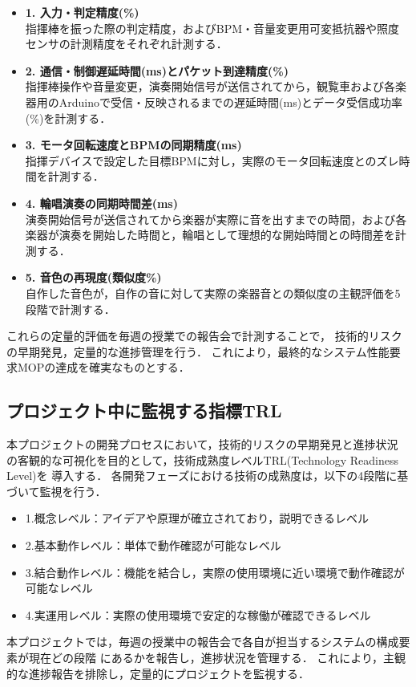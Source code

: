 \documentclass[lualatex,book,paper=a4paper,jafontsize=11.5pt,jafontscale=1.05]{jlreq}
\begin{document}
\begin{itemize}
	\item \textbf{1. 入力・判定精度(\%)}
		\\ 指揮棒を振った際の判定精度，およびBPM・音量変更用可変抵抗器や照度センサの計測精度をそれぞれ計測する．
	
	\item \textbf{2. 通信・制御遅延時間(ms)とパケット到達精度(\%)}
		\\ 指揮棒操作や音量変更，演奏開始信号が送信されてから，観覧車および各楽器用のArduinoで受信・反映されるまでの遅延時間(ms)とデータ受信成功率(\%)を計測する．
	
	\item \textbf{3. モータ回転速度とBPMの同期精度(ms)}
	\\ 指揮デバイスで設定した目標BPMに対し，実際のモータ回転速度とのズレ時間を計測する．
	
	\item \textbf{4. 輪唱演奏の同期時間差(ms)}
	\\ 演奏開始信号が送信されてから楽器が実際に音を出すまでの時間，および各楽器が演奏を開始した時間と，輪唱として理想的な開始時間との時間差を計測する．
	
\item \textbf{5. 音色の再現度(類似度\%)}
	\\ 自作した音色が，自作の音に対して実際の楽器音との類似度の主観評価を5段階で計測する．
\end{itemize}

これらの定量的評価を毎週の授業での報告会で計測することで，
技術的リスクの早期発見，定量的な進捗管理を行う．
これにより，最終的なシステム性能要求MOPの達成を確実なものとする．

\subsection{プロジェクト中に監視する指標TRL}
本プロジェクトの開発プロセスにおいて，技術的リスクの早期発見と進捗状況
の客観的な可視化を目的として，技術成熟度レベルTRL(Technology Readiness Level)を
導入する．
各開発フェーズにおける技術の成熟度は，以下の4段階に基づいて監視を行う．
\begin{itemize}
	\item 1.概念レベル：アイデアや原理が確立されており，説明できるレベル
	\item 2.基本動作レベル：単体で動作確認が可能なレベル
	\item 3.結合動作レベル：機能を結合し，実際の使用環境に近い環境で動作確認が可能なレベル
	\item 4.実運用レベル：実際の使用環境で安定的な稼働が確認できるレベル
\end{itemize}
本プロジェクトでは，毎週の授業中の報告会で各自が担当するシステムの構成要素が現在どの段階
にあるかを報告し，進捗状況を管理する．
これにより，主観的な進捗報告を排除し，定量的にプロジェクトを監視する．
\end{document}
